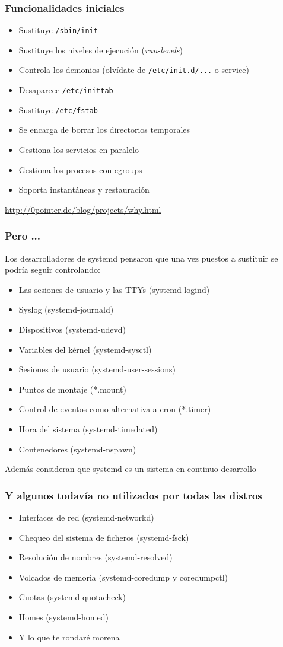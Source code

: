\documentclass[aspectratio=169]{beamer}
\begin{document}
\begin{frame}
  \frametitle{Funcionalidades iniciales}
  \begin{itemize}
  \item Sustituye \texttt{/sbin/init}
  \item Sustituye los niveles de ejecución (\textit{run-levels})
  \item Controla los demonios (olvídate de \texttt{/etc/init.d/...} o service)
  \item Desaparece \texttt{/etc/inittab}
  \item Sustituye \texttt{/etc/fstab}
  \item Se encarga de borrar los directorios temporales
  \item Gestiona los servicios en paralelo
  \item Gestiona los procesos con cgroups
  \item Soporta instantáneas y restauración
  \end{itemize}
  \url{http://0pointer.de/blog/projects/why.html}
\end{frame}

\begin{frame}
  \frametitle{Pero ...}
  Los desarrolladores de systemd pensaron que una vez puestos a sustituir se podría seguir controlando:
  \begin{itemize}
  \item Las sesiones de usuario y las TTYs (systemd-logind)
  \item Syslog (systemd-journald)
  \item Dispositivos (systemd-udevd)
  \item Variables del kérnel (systemd-sysctl)
  \item Sesiones de usuario (systemd-user-sessions)
  \item Puntos de montaje (*.mount)
  \item Control de eventos como alternativa a cron (*.timer)
  \item Hora del sistema (systemd-timedated)
  \item Contenedores (systemd-nspawn)
  \end{itemize}
  Además consideran que systemd es un sistema en continuo desarrollo
\end{frame}

\begin{frame}
  \frametitle{Y algunos todavía no utilizados por todas las distros}
  \begin{itemize}
  \item Interfaces de red (systemd-networkd)
  \item Chequeo del sistema de ficheros (systemd-fsck)
  \item Resolución de nombres (systemd-resolved)
  \item Volcados de memoria (systemd-coredump y coredumpctl)
  \item Cuotas (systemd-quotacheck)
  \item Homes (systemd-homed)
  \item Y lo que te rondaré morena
  \end{itemize}
\end{frame}
\end{document}
